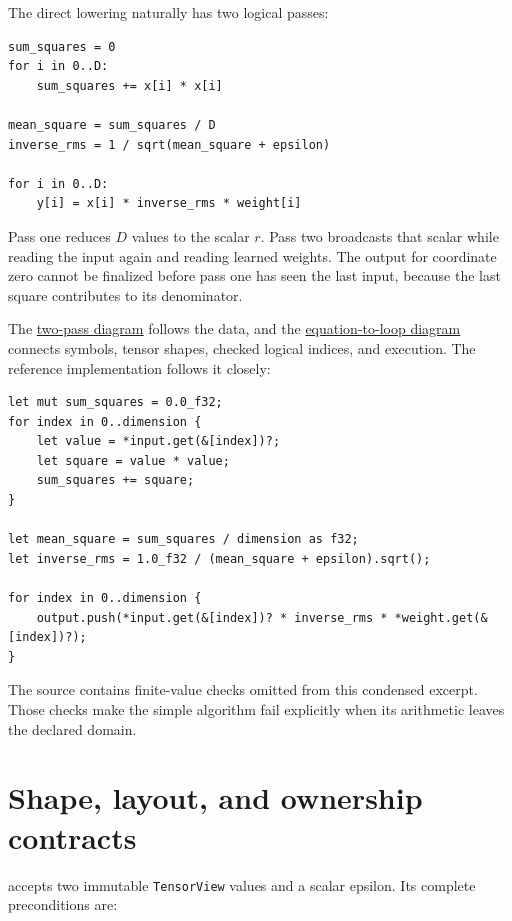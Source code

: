 The direct lowering naturally has two logical passes:

\begin{verbatim}
sum_squares = 0
for i in 0..D:
    sum_squares += x[i] * x[i]

mean_square = sum_squares / D
inverse_rms = 1 / sqrt(mean_square + epsilon)

for i in 0..D:
    y[i] = x[i] * inverse_rms * weight[i]
\end{verbatim}

Pass one reduces \(D\) values to the scalar \(r\). Pass two broadcasts
that scalar while reading the input again and reading learned weights.
The output for coordinate zero cannot be finalized before pass one has
seen the last input, because the last square contributes to its
denominator.

The
\href{https://github.com/hermonai/inside-the-llm-engine/blob/astra-visual-rewrite/diagrams/transformer/rmsnorm-two-pass.txt}{two-pass
diagram} follows the data, and the
\href{https://github.com/hermonai/inside-the-llm-engine/blob/astra-visual-rewrite/diagrams/transformer/equation-to-loop.txt}{equation-to-loop
diagram} connects symbols, tensor shapes, checked logical indices, and
execution. The reference implementation follows it closely:


\begin{verbatim}
let mut sum_squares = 0.0_f32;
for index in 0..dimension {
    let value = *input.get(&[index])?;
    let square = value * value;
    sum_squares += square;
}

let mean_square = sum_squares / dimension as f32;
let inverse_rms = 1.0_f32 / (mean_square + epsilon).sqrt();

for index in 0..dimension {
    output.push(*input.get(&[index])? * inverse_rms * *weight.get(&[index])?);
}
\end{verbatim}

The source contains finite-value checks omitted from this condensed
excerpt. Those checks make the simple algorithm fail explicitly when its
arithmetic leaves the declared domain.

\section{Shape, layout, and ownership
contracts}\label{shape-layout-and-ownership-contracts}

\texttt{} accepts two immutable
\texttt{TensorView} values and a scalar epsilon. Its complete
preconditions are:

